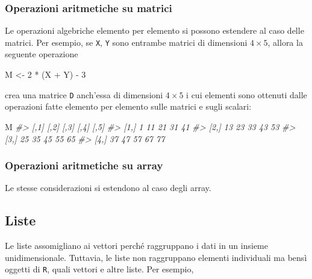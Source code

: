 \documentclass[
  11pt,
]{krantz}
\makeatletter
\newenvironment{Shaded}{\begin{snugshade}}{\end{snugshade}}
\newcommand{\CommentTok}[1]{\textcolor[rgb]{0.37,0.37,0.37}{\textit{#1}}}
\newcommand{\DecValTok}[1]{\textcolor[rgb]{0.06,0.06,0.06}{#1}}
\newcommand{\NormalTok}[1]{#1}
\newcommand{\OtherTok}[1]{\textcolor[rgb]{0.37,0.37,0.37}{#1}}
\newcommand{\SpecialCharTok}[1]{\textcolor[rgb]{0,0,0}{#1}}
\newenvironment{kframe}{%
\medskip{}
\setlength{\fboxsep}{.8em}
 \def\at@end@of@kframe{}%
 \ifinner\ifhmode%
  \def\at@end@of@kframe{\end{minipage}}%
  \begin{minipage}{\columnwidth}%
 \fi\fi%
 \def\FrameCommand##1{\hskip\@totalleftmargin \hskip-\fboxsep
 \colorbox{shadecolor}{##1}\hskip-\fboxsep
     \hskip-\linewidth \hskip-\@totalleftmargin \hskip\columnwidth}%
 \MakeFramed {\advance\hsize-\width
   \@totalleftmargin\z@ \linewidth\hsize
   \@setminipage}}%
 {\par\unskip\endMakeFramed%
 \at@end@of@kframe}
\renewenvironment{Shaded}{\begin{kframe}}{\end{kframe}}
\theoremstyle{definition}
\theoremstyle{definition}
\theoremstyle{definition}
\theoremstyle{definition}
\theoremstyle{remark}
\makeatother
\begin{document}
\hypertarget{operazioni-aritmetiche-su-matrici}{%
\subsubsection{Operazioni aritmetiche su matrici}\label{operazioni-aritmetiche-su-matrici}}

Le operazioni algebriche elemento per elemento si possono estendere al caso delle matrici. Per esempio, se \texttt{X}, \texttt{Y} sono entrambe matrici di dimensioni \(4 \times 5\), allora la seguente operazione

\begin{Shaded}
\begin{Highlighting}[]
\NormalTok{M }\OtherTok{\textless{}{-}} \DecValTok{2} \SpecialCharTok{*}\NormalTok{ (X }\SpecialCharTok{+}\NormalTok{ Y) }\SpecialCharTok{{-}} \DecValTok{3} 
\end{Highlighting}
\end{Shaded}

crea una matrice \texttt{D} anch'essa di dimensioni \(4 \times 5\) i cui elementi sono ottenuti dalle operazioni fatte elemento per elemento sulle matrici e sugli scalari:

\begin{Shaded}
\begin{Highlighting}[]
\NormalTok{M}
\CommentTok{\#\textgreater{}      [,1] [,2] [,3] [,4] [,5]}
\CommentTok{\#\textgreater{} [1,]    1   11   21   31   41}
\CommentTok{\#\textgreater{} [2,]   13   23   33   43   53}
\CommentTok{\#\textgreater{} [3,]   25   35   45   55   65}
\CommentTok{\#\textgreater{} [4,]   37   47   57   67   77}
\end{Highlighting}
\end{Shaded}

\hypertarget{operazioni-aritmetiche-su-array}{%
\subsubsection{Operazioni aritmetiche su array}\label{operazioni-aritmetiche-su-array}}

Le stesse considerazioni si estendono al caso degli array.

\hypertarget{liste}{%
\subsection{Liste}\label{liste}}

Le liste assomigliano ai vettori perché raggruppano i dati in un insieme unidimensionale. Tuttavia, le liste non raggruppano elementi individuali ma bensì oggetti di \texttt{R}, quali vettori e altre liste. Per esempio,
\end{document}
